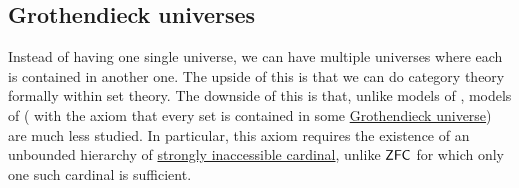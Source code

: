 \subsection{Grothendieck universes}\label{subsec:grothendieck_universes}

Instead of having one single universe, we can have multiple universes where each is contained in another one. The upside of this is that we can do category theory formally within set theory. The downside of this is that, unlike models of \hyperref[def:zfc]{}, models of \hyperref[def:axiom_of_universes]{} ( with the axiom that every set is contained in some \hyperref[def:grothendieck_universe]{Grothendieck universe}) are much less studied. In particular, this axiom requires the existence of an unbounded hierarchy of \hyperref[def:regular_cardinal]{strongly inaccessible cardinal}, unlike \( \textsf{ZFC} \) for which only one such cardinal is sufficient.

